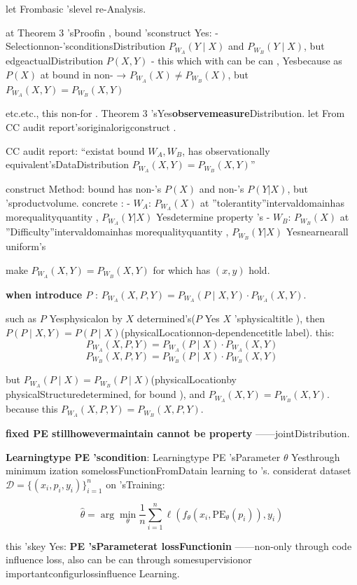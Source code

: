 \documentclass[
  12pt,
]{article}
\begin{document}
let Frombasic 'slevel re-Analysis. 

at  Theorem 3 'sProofin , bound 'sconstruct Yes:  - Selectionnon-'sconditionsDistribution
\(P_{W_A}(Y \mid X)\) and  \(P_{W_B}(Y \mid X)\), but edgeactualDistribution \(P(X, Y)\)
 - this which with can be can , Yesbecause as  \(P(X)\) at bound in non- →
\(P_{W_A}(X) \neq P_{W_B}(X)\), but  \(P_{W_A}(X, Y) = P_{W_B}(X, Y)\)

etc.etc., this non-for . Theorem 3 'sYes\textbf{observemeasure}Distribution. let From CC
audit report'soriginalorigconstruct . 

CC audit report: ``existat bound  \(W_A, W_B\), has observationally equivalent'sDataDistribution
\(P_{W_A}(X, Y) = P_{W_B}(X, Y)\)''

construct Method: bound has non-'s \(P(X)\) and non-'s
\(P(Y|X)\), but 'sproductvolume. concrete :  - \(W_A\): \(P_{W_A}(X)\)
at ''tolerantity''intervaldomainhas morequalityquantity , \(P_{W_A}(Y|X)\) Yesdetermine property 's -
\(W_B\): \(P_{W_B}(X)\) at ''Difficulty''intervaldomainhas morequalityquantity , \(P_{W_B}(Y|X)\)
Yesnearnearall uniform's

make  \(P_{W_A}(X, Y) = P_{W_B}(X, Y)\) for which has  \((x, y)\) hold. 

\textbf{when introduce  \(P\)
}: \(P_{W_A}(X, P, Y) = P_{W_A}(P \mid X, Y) \cdot P_{W_A}(X, Y)\). 

such as  \(P\) Yesphysicalon by  \(X\) determined's(\(P\) Yes \(X\) 'sphysicaltitle ), then 
\(P(P \mid X, Y) = P(P \mid X)\)(physicalLocationnon-dependencetitle label). this: 
\[P_{W_A}(X, P, Y) = P_{W_A}(P \mid X) \cdot P_{W_A}(X, Y)\]
\[P_{W_B}(X, P, Y) = P_{W_B}(P \mid X) \cdot P_{W_B}(X, Y)\]

but 
\(P_{W_A}(P \mid X) = P_{W_B}(P \mid X)\)(physicalLocationby physicalStructuredetermined, for bound ), and 
\(P_{W_A}(X, Y) = P_{W_B}(X, Y)\). because this
\(P_{W_A}(X, P, Y) = P_{W_B}(X, P, Y)\). 

\textbf{fixed  PE stillhowevermaintain cannot be property }------jointDistribution. 

\textbf{Learningtype  PE 'scondition}: Learningtype  PE 'sParameter \(\theta\)
Yesthrough minimum ization somelossFunctionFromDatain learning to 's.  considerat dataset
\(\mathcal{D} = \{(x_i, p_i, y_i)\}_{i=1}^n\) on 'sTraining: 

\[\hat{\theta} = \arg\min_\theta \frac{1}{n} \sum_{i=1}^n \ell(f_\theta(x_i, \text{PE}_\theta(p_i)), y_i)\]

this 'skey Yes: \textbf{PE
'sParameterat lossFunctionin }------non-only through code influence loss, also can be can through somesupervisionor importantconfigurlossinfluence Learning. 
\end{document}
